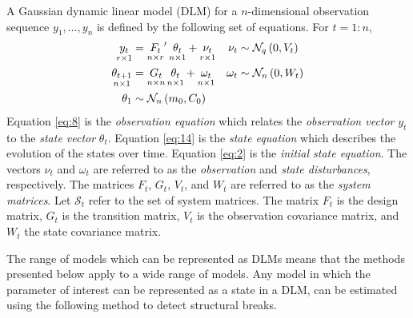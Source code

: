 \documentclass{article}
\begin{document}
A Gaussian dynamic linear model (DLM) for a $n$-dimensional observation sequence $y_{1}, \dots, y_{n}$ is defined by the following set of equations.%
For $t = 1:n$,
\begin{align}
  \label{eq:8}
  \underset{r \times 1}{y_t} &= \underset{n \times r}{F_{t}}' \, \underset{n \times 1}{\theta_t} + \underset{r \times 1}{\nu_t} & \nu_{t} &\sim \dmvnorm{0, V_{t}}{q} \\
  \label{eq:14}
  \underset{n \times 1}{\theta_{t+1}} &= \underset{n \times n}{G_{t}} \, \underset{n \times 1}{\theta_{t}} + \underset{n \times 1}{\omega_{t}} & \omega_{t} &\sim \dmvnorm{0, W_{t}}{n} \\
  \label{eq:2}
  \theta_{1} & \sim \dmvnorm{m_{0}, C_{0}}{n}
\end{align}
Equation \eqref{eq:8} is the \textit{observation equation} which relates the \textit{observation vector} $y_{t}$ to the \textit{state vector} $\theta_{t}$.
Equation \eqref{eq:14} is the \textit{state equation} which describes the evolution of the states over time.
Equation \eqref{eq:2} is the \textit{initial state equation}.
The vectors $\nu_{t}$ and $\omega_{t}$ are referred to as the \textit{observation} and \textit{state disturbances}, respectively.
The matrices $F_{t}$, $G_{t}$, $V_{t}$, and $W_{t}$ are referred to as the \textit{system matrices}.
Let $\mathcal{S}_{t}$ refer to the set of system matrices.
The matrix $F_{t}$ is the design matrix, $G_{t}$ is the transition matrix, $V_{t}$ is the observation covariance matrix, and $W_{t}$ the state covariance matrix.

The range of models which can be represented as DLMs means that the methods presented below apply to a wide range of models.
Any model in which the parameter of interest can be represented as a state in a DLM, can be estimated using the following method to detect structural breaks.
\end{document}
